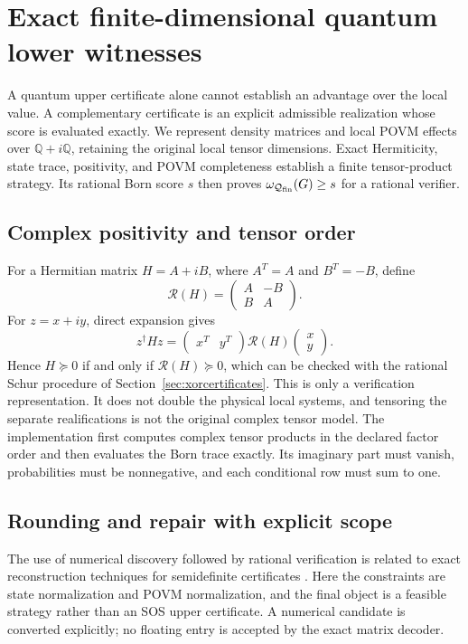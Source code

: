 \section{Exact finite-dimensional quantum lower witnesses}
\label{sec:exactquantum}

A quantum upper certificate alone cannot establish an advantage over the local
value. A complementary certificate is an explicit admissible realization whose
score is evaluated exactly. We represent density matrices and local POVM effects
over $\mathbb Q+i\mathbb Q$, retaining the original local tensor dimensions.
Exact Hermiticity, state trace, positivity, and POVM completeness establish a
finite tensor-product strategy. Its rational Born score $s$ then proves
$\omega_{\mathcal Q_{\rm fin}}(G)\geq s$ for a rational verifier.

\subsection{Complex positivity and tensor order}
For a Hermitian matrix $H=A+iB$, where $A^T=A$ and $B^T=-B$, define
\[
 \mathcal R(H)=\begin{pmatrix}A&-B\\B&A\end{pmatrix}.
\]
For $z=x+iy$, direct expansion gives
\[
 z^\dagger Hz=\begin{pmatrix}x^T&y^T\end{pmatrix}
 \mathcal R(H)\begin{pmatrix}x\\y\end{pmatrix}.
\]
Hence $H\succeq0$ if and only if $\mathcal R(H)\succeq0$, which can be checked
with the rational Schur procedure of Section~\ref{sec:xorcertificates}. This is
only a verification representation. It does not double the physical local
systems, and tensoring the separate realifications is not the original complex
tensor model. The implementation first computes complex tensor products in the
declared factor order and then evaluates the Born trace exactly. Its imaginary
part must vanish, probabilities must be nonnegative, and each conditional row
must sum to one.

\subsection{Rounding and repair with explicit scope}
The use of numerical discovery followed by rational verification is related to
exact reconstruction techniques for semidefinite certificates
\cite{peyrl2008}. Here the constraints are state normalization and POVM
normalization, and the final object is a feasible strategy rather than an SOS
upper certificate. A numerical candidate is converted explicitly; no floating
entry is accepted by the exact matrix decoder.

